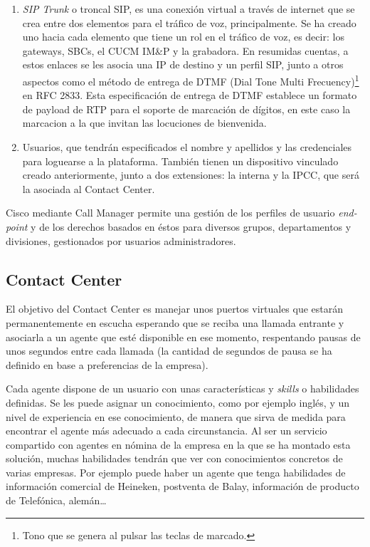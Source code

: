 \documentclass[a4paper, 12pt]{book}
\begin{document}
\begin{enumerate}
  \item \emph{SIP Trunk} o troncal SIP, es una conexión virtual a través de internet que se crea entre dos elementos para el tráfico de voz, principalmente. Se ha creado uno hacia cada elemento que tiene un rol en el tráfico de voz, es decir: los gateways, SBCs, el CUCM IM\&P y la grabadora. En resumidas cuentas, a estos enlaces se les asocia una IP de destino y un perfil SIP, junto a otros aspectos como el método de entrega de DTMF (Dial Tone Multi Frecuency)\footnote{Tono que se genera al pulsar las teclas de marcado.} en RFC 2833. Esta especificación de entrega de DTMF establece un formato de payload de RTP para el soporte de marcación de dígitos, en este caso la marcacion a la que invitan las locuciones de bienvenida.
  \item Usuarios, que tendrán especificados el nombre y apellidos y las credenciales para loguearse a la plataforma. También tienen un dispositivo vinculado creado anteriormente, junto a dos extensiones: la interna y la IPCC, que será la asociada al Contact Center.
\end{enumerate}

Cisco mediante Call Manager permite una gestión de los perfiles de usuario \emph{end-point} y de los derechos basados en éstos para diversos grupos, departamentos y divisiones, gestionados por usuarios administradores.

\subsection{Contact Center}
\label{sec:contact_center}

El objetivo del Contact Center es manejar unos puertos virtuales que estarán permanentemente en escucha esperando que se reciba una llamada entrante y asociarla a un agente que esté disponible en ese momento, respentando pausas de unos segundos entre cada llamada (la cantidad de segundos de pausa se ha definido en base a preferencias de la empresa).

Cada agente dispone de un usuario con unas características y \emph{skills} o habilidades definidas. Se les puede asignar un conocimiento, como por ejemplo inglés, y un nivel de experiencia en ese conocimiento, de manera que sirva de medida para encontrar el agente más adecuado a cada circunstancia.
Al ser un servicio compartido con agentes en nómina de la empresa en la que se ha montado esta solución, muchas habilidades tendrán que ver con conocimientos concretos de varias empresas. Por ejemplo puede haber un agente que tenga habilidades de  información comercial de Heineken, postventa de Balay, información de producto de Telefónica, alemán\ldots
\end{document}
